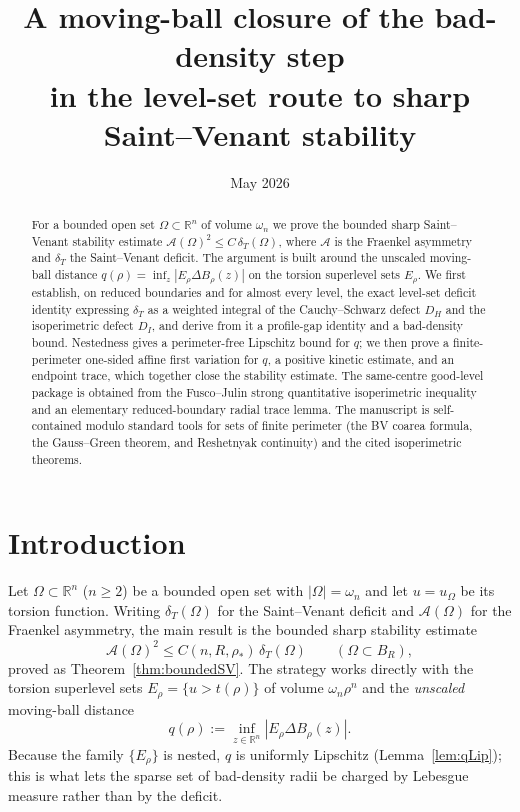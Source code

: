 \documentclass[11pt]{amsart}
\title[Moving-ball closure of the bad-density step]
{A moving-ball closure of the bad-density step\\
in the level-set route to sharp Saint--Venant stability}
\author{}
\date{May 2026}
\theoremstyle{definition}
\newcommand{\R}{\mathbb R}
\newcommand{\Om}{\Omega}
\newcommand{\Fr}{\mathcal A}
\newcommand{\dT}{\delta_T}
\newcommand{\rstar}{\rho_*}
\begin{document}
\begin{abstract}
For a bounded open set \(\Om\subset\R^n\) of volume \(\omega_n\) we prove the
bounded sharp Saint--Venant stability estimate
\(\Fr(\Om)^2\le C\,\dT(\Om)\), where \(\Fr\) is the Fraenkel asymmetry and
\(\dT\) the Saint--Venant deficit.  The argument is built around the unscaled
moving-ball distance \(q(\rho)=\inf_{z}|E_\rho\Delta B_\rho(z)|\) on the
torsion superlevel sets \(E_\rho\).  We first establish, on reduced boundaries
and for almost every level, the exact level-set deficit identity expressing
\(\dT\) as a weighted integral of the Cauchy--Schwarz defect \(D_H\) and the
isoperimetric defect \(D_I\), and derive from it a profile-gap identity and a
bad-density bound.  Nestedness gives a perimeter-free Lipschitz bound for
\(q\); we then prove a finite-perimeter one-sided affine first variation for
\(q\), a positive kinetic estimate, and an endpoint trace, which together close
the stability estimate.  The same-centre good-level package is obtained from
the Fusco--Julin strong quantitative isoperimetric inequality and an elementary
reduced-boundary radial trace lemma.  The manuscript is self-contained modulo
standard tools for sets of finite perimeter (the BV coarea formula, the
Gauss--Green theorem, and Reshetnyak continuity) and the cited isoperimetric
theorems.
\end{abstract}

\maketitle
\tableofcontents

\section{Introduction}\label{sec:intro}

Let \(\Om\subset\R^n\) (\(n\ge2\)) be a bounded open set with \(|\Om|=\omega_n\)
and let \(u=u_\Om\) be its torsion function.  Writing \(\dT(\Om)\) for the
Saint--Venant deficit and \(\Fr(\Om)\) for the Fraenkel asymmetry, the main
result is the bounded sharp stability estimate
\[
   \Fr(\Om)^2\le C(n,R,\rstar)\,\dT(\Om)
   \qquad(\Om\subset B_R),
\]
proved as Theorem~\ref{thm:boundedSV}.  The strategy works directly with the
torsion superlevel sets \(E_\rho=\{u>t(\rho)\}\) of volume \(\omega_n\rho^n\)
and the \emph{unscaled} moving-ball distance
\[
   q(\rho):=\inf_{z\in\R^n}|E_\rho\Delta B_\rho(z)| .
\]
Because the family \(\{E_\rho\}\) is nested, \(q\) is uniformly Lipschitz
(Lemma~\ref{lem:qLip}); this is what lets the sparse set of bad-density radii be
charged by Lebesgue measure rather than by the deficit.
\end{document}

